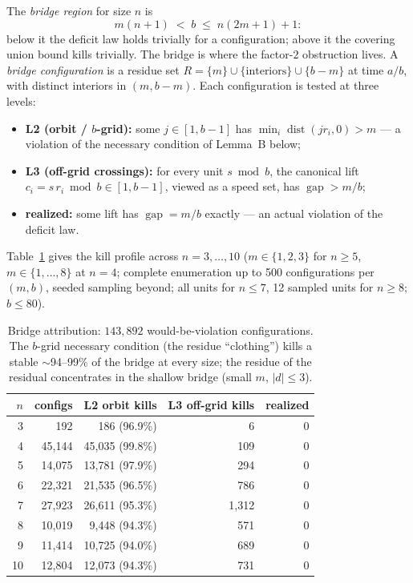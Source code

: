\documentclass[11pt,a4paper]{article}
\theoremstyle{plain}
\theoremstyle{definition}
\theoremstyle{remark}
\newcommand{\gap}{\operatorname{gap}}
\newcommand{\dist}{\operatorname{dist}}
\begin{document}
The \emph{bridge region} for size $n$ is
\[
  m(n+1) \;<\; b \;\le\; n(2m+1) + 1 :
\]
below it the deficit law holds trivially for a configuration; above it the covering
union bound kills trivially. The bridge is where the factor-$2$ obstruction lives. A
\emph{bridge configuration} is a residue set
$R = \{m\} \cup \{\text{interiors}\} \cup \{b - m\}$ at time $a/b$, with distinct
interiors in $(m, b - m)$. Each configuration is tested at three levels:
\begin{itemize}[leftmargin=*]
\item \textbf{L2 (orbit / $b$-grid):} some $j \in [1, b-1]$ has
$\min_i \dist(j r_i, 0) > m$ --- a violation of the necessary condition of Lemma~B
below;
\item \textbf{L3 (off-grid crossings):} for every unit $s \bmod b$, the canonical lift
$c_i = s\,r_i \bmod b \in [1, b-1]$, viewed as a speed set, has $\gap > m/b$;
\item \textbf{realized:} some lift has $\gap = m/b$ exactly --- an actual violation of
the deficit law.
\end{itemize}

Table~\ref{tab:bridge} gives the kill profile across $n = 3, \dots, 10$ ($m \in \{1,2,3\}$
for $n \ge 5$, $m \in \{1,\dots,8\}$ at $n = 4$; complete enumeration up to 500
configurations per $(m, b)$, seeded sampling beyond; all units for $n \le 7$, 12 sampled
units for $n \ge 8$; $b \le 80$).

\begin{table}[ht]
\centering\small
\begin{tabular}{rrrrr}
\toprule
$n$ & configs & L2 orbit kills & L3 off-grid kills & realized \\
\midrule
3 & 192 & 186 \; (96.9\%) & 6 & 0 \\
4 & 45{,}144 & 45{,}035 \; (99.8\%) & 109 & 0 \\
5 & 14{,}075 & 13{,}781 \; (97.9\%) & 294 & 0 \\
6 & 22{,}321 & 21{,}535 \; (96.5\%) & 786 & 0 \\
7 & 27{,}923 & 26{,}611 \; (95.3\%) & 1{,}312 & 0 \\
8 & 10{,}019 & 9{,}448 \; (94.3\%) & 571 & 0 \\
9 & 11{,}414 & 10{,}725 \; (94.0\%) & 689 & 0 \\
10 & 12{,}804 & 12{,}073 \; (94.3\%) & 731 & 0 \\
\bottomrule
\end{tabular}
\caption{Bridge attribution: $143{,}892$ would-be-violation configurations. The
$b$-grid necessary condition (the residue ``clothing'') kills a stable $\sim$94--99\%
of the bridge at every size; the residue of the residual concentrates in the shallow
bridge (small $m$, $|d| \le 3$).}
\label{tab:bridge}
\end{table}
\end{document}
